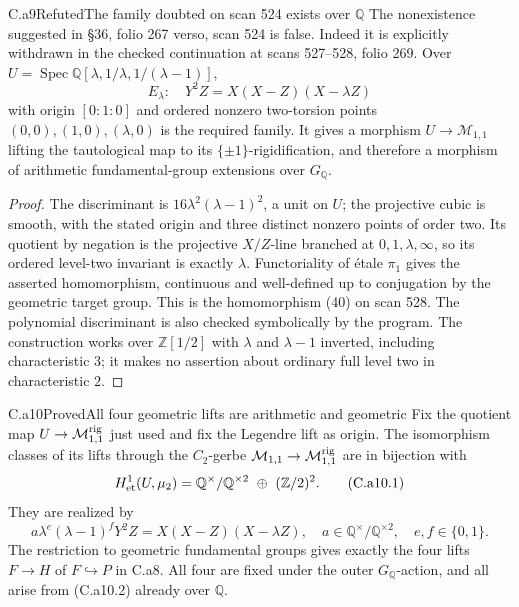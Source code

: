 \begin{claim}{C.a9}{Refuted}{The family doubted on scan 524 exists over $\mathbb Q$}
The nonexistence suggested in \S36, folio 267 verso, scan 524 is false.
Indeed it is explicitly withdrawn in the checked continuation at scans
527--528, folio 269. Over
$U=\operatorname{Spec}\mathbb Q[\lambda,1/\lambda,1/(\lambda-1)]$,
\[
 E_\lambda:\quad Y^2Z=X(X-Z)(X-\lambda Z)
 \tag{C.a9.1}
\]
with origin $[0:1:0]$ and ordered nonzero two-torsion points
$(0,0),(1,0),(\lambda,0)$ is the required family. It gives a morphism
$U\to\mathcal M_{1,1}$ lifting the tautological map to its
$\{\pm1\}$-rigidification, and therefore a morphism of arithmetic
fundamental-group extensions over $G_{\mathbb Q}$.
\end{claim}
\begin{proof}
The discriminant is $16\lambda^2(\lambda-1)^2$, a unit on $U$;
the projective cubic is smooth, with the stated origin and three distinct
nonzero points of order two. Its quotient by negation is the projective
$X/Z$-line branched at $0,1,\lambda,\infty$, so its ordered level-two
invariant is exactly $\lambda$. Functoriality of \'etale $\pi_1$ gives
the asserted homomorphism, continuous and well-defined up to conjugation
by the geometric target group. This is the homomorphism (40) on scan
528. The polynomial discriminant is also checked symbolically by the
program. The construction works over $\mathbb Z[1/2]$ with
$\lambda$ and $\lambda-1$ inverted, including characteristic $3$;
it makes no assertion about ordinary full level two in characteristic $2$.
\end{proof}

\begin{claim}{C.a10}{Proved}{All four geometric lifts are arithmetic and geometric}
Fix the quotient map $U\to\mathcal M_{1,1}^{\rm rig}$ just used and
fix the Legendre lift as origin. The isomorphism classes of its lifts
through the $C_2$-gerbe $\mathcal M_{1,1}\to\mathcal M_{1,1}^{\rm rig}$
are in bijection with
\[
 H^1_{\rm et}(U,\mu_2)
 =\mathbb Q^{\times}/\mathbb Q^{\times2}\ \oplus\ (\mathbb Z/2)^2.
 \tag{C.a10.1}
\]
They are realized by
\[
 a\lambda^e(\lambda-1)^fY^2Z=X(X-Z)(X-\lambda Z),
 \quad a\in\mathbb Q^{\times}/\mathbb Q^{\times2},\quad e,f\in\{0,1\}.
 \tag{C.a10.2}
\]
The restriction to geometric fundamental groups gives exactly the four
lifts $F\to H$ of $F\hookrightarrow P$ in C.a8. All four are fixed
under the outer $G_{\mathbb Q}$-action, and all arise from (C.a10.2)
already over $\mathbb Q$.
\end{claim}

